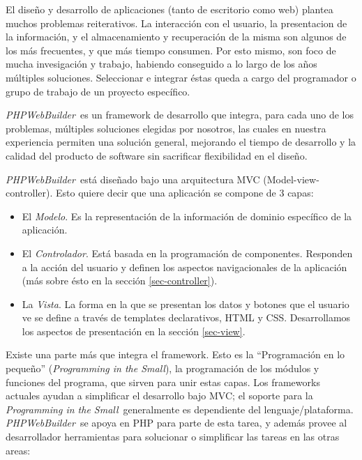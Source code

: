 \documentclass[a4paper,10pt,draft]{article}
\newcommand{\PITS}{\emph{Programming in the Small}} %
\newcommand{\PWB}{\emph{PHPWebBuilder}}
\begin{document}
El diseño y desarrollo de aplicaciones (tanto de escritorio como web) plantea muchos problemas reiterativos. La interacción con el usuario, la presentacion de la información, y el almacenamiento y recuperación de la misma son algunos de los más frecuentes, y que más tiempo consumen.
Por esto mismo, son foco de mucha invesigación y trabajo, habiendo conseguido a lo largo de los años múltiples soluciones. Seleccionar e integrar éstas queda a cargo del programador o grupo de trabajo de un proyecto específico.

\PWB \ es un framework de desarrollo que integra, para cada uno de los problemas, múltiples soluciones elegidas por nosotros, las cuales en nuestra experiencia permiten una solución general, mejorando el tiempo de desarrollo y la calidad del producto de software sin sacrificar flexibilidad en el diseño.


\PWB \ está diseñado bajo una arquitectura MVC (Model-view-controller)\cite{mvc}.
Esto quiere decir que una aplicación se compone de 3 capas:
\begin{itemize}
\item El \emph{Modelo}. Es la representación de la información de dominio específico de la aplicación.
\item El \emph{Controlador}. Está basada en la programación de componentes. Responden a la acción del usuario y definen los aspectos navigacionales de la aplicación (más sobre ésto en la sección \ref{sec-controller}).
\item La \emph{Vista}. La forma en la que se presentan los datos y botones que el usuario ve se define a través de templates declarativos, HTML y CSS. Desarrollamos los aspectos de presentación en la sección \ref{sec-view}.
\end{itemize}

Existe una parte más que integra el framework. Esto es la ``Programación en lo pequeño'' (\PITS), la programación de los módulos y funciones del programa, que sirven para unir estas capas. Los frameworks actuales ayudan a simplificar el desarrollo bajo MVC; el soporte para la \PITS \ generalmente es dependiente del lenguaje/plataforma. \PWB \ se apoya en PHP para parte de esta tarea, y además provee al desarrollador herramientas para solucionar o simplificar las tareas en las otras areas:
\end{document}
